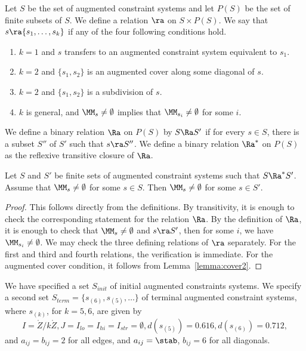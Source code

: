 \begin{definition}[$\ra$~$\Ra$~$\Ra^*$]  
Let $S$ be the set of augmented constraint systems
and let $P(S)$ be the set of finite subsets of $S$.  We define a relation $\ra$ on $S\times P(S)$.
We say that $s\ra \{s_1,\ldots,s_k\}$ if any of the four following conditions hold.
\begin{enumerate}
\item $k=1$ and $s$ transfers to an augmented constraint system equivalent to $s_1$.
\item $k=2$ and $\{s_1,s_2\}$ is an augmented cover along some diagonal of $s$.
\item $k=2$ and $\{s_1,s_2\}$ is a subdivision of $s$.
\item $k$ is general, and $\MM_s\ne\emptyset$ implies that 
$\MM_{s_i}\ne\emptyset$ for some $i$.
\end{enumerate}
We define a binary relation $\Ra$ on $P(S)$ by
$S\Ra S'$ if for every $s\in S$, there is a subset $S''$ of $S'$ such that
$s\ra S''$.  We define a binary relation $\Ra^*$ on $P(S)$ as the reflexive
transitive closure of $\Ra$.
\end{definition}

\begin{lemma}\label{lemma:propagate}
Let $S$  and $S'$ be finite sets of augmented constraint systems such that
$S\Ra^* S'$.  Assume that $\MM_s\ne\emptyset$ for some $s\in S$.
Then $\MM_s\ne\emptyset$ for some $s\in S'$.
\end{lemma}

\begin{proof} This follows directly from the definitions.  By transitivity,
it is enough to check the corresponding statement for the relation $\Ra$.
By the definition of $\Ra$, it is enough to check that $\MM_s\ne\emptyset$
and $s\ra S'$, then for some $i$, we have $\MM_{s_i}\ne\emptyset$.  We
may check the three defining relations of $\ra$ separately.  For the first
and third and fourth relations, the verification is immediate.  For the augmented cover
condition, it follows from Lemma~\ref{lemma:cover2}.
\end{proof}

We have specified a set $S_{init}$ of initial augmented constraints systems.
We specify a second set $S_{term}=\{s_{(6)},s_{(5)},\ldots\}$ 
of terminal augmented constraint systems, where
 $s_{(k)}$, for $k=5,6$,  are given by
\[
I=\ring{Z}/k\ring{Z}, J=I_{lo}=I_{hi}=I_{str}=\emptyset, d(s_{(5)})=0.616, d(s_{(6)})=0.712,
\]
and $a_{ij}=b_{ij}=2$ for all edges, 
and $a_{ij}=\stab$, $b_{ij}=6$ for all diagonals.

